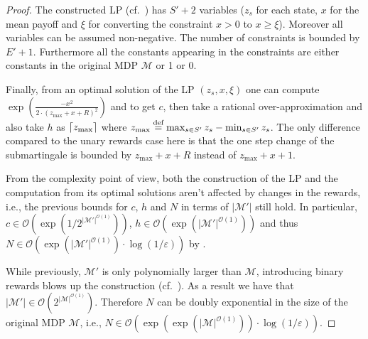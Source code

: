 \documentclass[a4paper,UKenglish,cleveref,autoref,thm-restate]{lipics-v2021}
\DeclarePairedDelimiter{\ceil}{\lceil}{\rceil}
\newcommand{\+}[1]{\mathbb{#1}}
\newcommand{\?}[1]{\mathcal{#1}}
\newcommand{\Ocompl}{\?{O}}
\newcommand{\abs}[1]{\lvert#1\rvert}
\newcommand{\size}[1]{\abs{#1}}
\newcommand{\eqby}[2][=]{\stackrel{\text{{\tiny{#2}}}}{#1}}
\newcommand{\eqdef}{\eqby{def}}
\newcommand{\eps}{\varepsilon}
\newcommand{\lrc}[1]{\left(#1\right)}
\newcommand{\tuple}[1]{\lrc{#1}}
\newcommand{\mdp}{{\mathcal M}}
\newcommand{\states}{S}
\newcommand{\s}{s}
\newcommand{\transition}{{E}}
\begin{document}
\begin{proof}
The constructed LP (cf.~\cite[Fig.1]{BBEK:IC2013}) has $\states' + 2$ variables ($z_\s$ for each state, $x$ for the mean payoff and $\xi$ for converting the constraint $x > 0$ to $x \geq \xi $). Moreover all variables can be assumed non-negative. The number of constraints is bounded by $\transition' + 1$. Furthermore all the constants appearing in the constraints are either constants in the original MDP $\mdp$ or 1 or 0.

Finally, from an optimal solution of the LP $\tuple{z_\s,x,\xi}$ one can
compute $\exp\lrc{\frac{-x^2}{2\cdot(z_{\max}+x+R)^2}}$ and to get $c$, then
take a rational over-approximation and also take $h$ as $\ceil{z_{\max}}$ where $z_{\max} \eqdef \max_{\s \in \states'}z_\s - \min_{\s \in \states'}z_\s$. The only difference compared to the unary rewards case here is that the one step change of the submartingale is bounded by $z_{\max}+x+R$ instead of $z_{\max}+x+1$.

From the complexity point of view, both the construction of the LP and
the computation from its optimal solutions aren't affected by
changes in the rewards, i.e., the
previous bounds for $c$, $h$ and $N$ in terms of $\size{\mdp'}$ still hold.
In particular, $c \in
{\Ocompl}\left(\exp\lrc{1/2^{\size{\mdp'}^{{\Ocompl}(1)}}}\right)$, $h \in
{\Ocompl}(\exp\lrc{\size{\mdp'}^{{\Ocompl}(1)}})$ and thus
$N \in {\Ocompl}\lrc{\exp\lrc{\size{\mdp'}^{{\Ocompl}(1)}}\cdot
  \log\lrc{1/\eps}}$ by
\cite[Claim~6]{BBEK:IC2013}.

While previously, $\mdp'$ is only polynomially larger
than $\mdp$, introducing binary rewards blows up the
construction (cf.~\cite[Appendix A.2]{BBEK:IC2013}).
As a result we have that
$\size{\mdp'} \in {\Ocompl}\lrc{2^{\size{\mdp}^{{\Ocompl}(1)}}}$.
Therefore $N$ can be doubly exponential in the size of the original MDP
$\mdp$,
i.e.,
$N \in {\Ocompl}\left(\exp(\exp(\size{\mdp}^{\Ocompl(1)}))\cdot \log\lrc{1/\eps}\right)$.
\end{proof}
\end{document}
